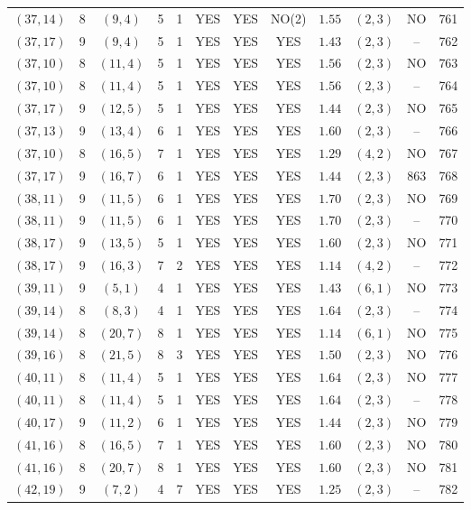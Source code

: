 \begin{longtable}{|c|c|c|c|c|c|c|c|c|c|c|c|}
$(37,14)$ & 8 & $(9,4)$ & 5 & 1 & YES & YES & NO(2) & $1.55$ & $(2,3)$ & NO & 761\\
$(37,17)$ & 9 & $(9,4)$ & 5 & 1 & YES & YES & YES & $1.43$ & $(2,3)$ & -- & 762\\
$(37,10)$ & 8 & $(11,4)$ & 5 & 1 & YES & YES & YES & $1.56$ & $(2,3)$ & NO & 763\\
$(37,10)$ & 8 & $(11,4)$ & 5 & 1 & YES & YES & YES & $1.56$ & $(2,3)$ & -- & 764\\
$(37,17)$ & 9 & $(12,5)$ & 5 & 1 & YES & YES & YES & $1.44$ & $(2,3)$ & NO & 765\\
$(37,13)$ & 9 & $(13,4)$ & 6 & 1 & YES & YES & YES & $1.60$ & $(2,3)$ & -- & 766\\
$(37,10)$ & 8 & $(16,5)$ & 7 & 1 & YES & YES & YES & $1.29$ & $(4,2)$ & NO & 767\\
$(37,17)$ & 9 & $(16,7)$ & 6 & 1 & YES & YES & YES & $1.44$ & $(2,3)$ & 863 & 768\\
$(38,11)$ & 9 & $(11,5)$ & 6 & 1 & YES & YES & YES & $1.70$ & $(2,3)$ & NO & 769\\
$(38,11)$ & 9 & $(11,5)$ & 6 & 1 & YES & YES & YES & $1.70$ & $(2,3)$ & -- & 770\\
$(38,17)$ & 9 & $(13,5)$ & 5 & 1 & YES & YES & YES & $1.60$ & $(2,3)$ & NO & 771\\
$(38,17)$ & 9 & $(16,3)$ & 7 & 2 & YES & YES & YES & $1.14$ & $(4,2)$ & -- & 772\\
$(39,11)$ & 9 & $(5,1)$ & 4 & 1 & YES & YES & YES & $1.43$ & $(6,1)$ & NO & 773\\
$(39,14)$ & 8 & $(8,3)$ & 4 & 1 & YES & YES & YES & $1.64$ & $(2,3)$ & -- & 774\\
$(39,14)$ & 8 & $(20,7)$ & 8 & 1 & YES & YES & YES & $1.14$ & $(6,1)$ & NO & 775\\
$(39,16)$ & 8 & $(21,5)$ & 8 & 3 & YES & YES & YES & $1.50$ & $(2,3)$ & NO & 776\\
$(40,11)$ & 8 & $(11,4)$ & 5 & 1 & YES & YES & YES & $1.64$ & $(2,3)$ & NO & 777\\
$(40,11)$ & 8 & $(11,4)$ & 5 & 1 & YES & YES & YES & $1.64$ & $(2,3)$ & -- & 778\\
$(40,17)$ & 9 & $(11,2)$ & 6 & 1 & YES & YES & YES & $1.44$ & $(2,3)$ & NO & 779\\
$(41,16)$ & 8 & $(16,5)$ & 7 & 1 & YES & YES & YES & $1.60$ & $(2,3)$ & NO & 780\\
$(41,16)$ & 8 & $(20,7)$ & 8 & 1 & YES & YES & YES & $1.60$ & $(2,3)$ & NO & 781\\
$(42,19)$ & 9 & $(7,2)$ & 4 & 7 & YES & YES & YES & $1.25$ & $(2,3)$ & -- & 782\\

\end{longtable}
